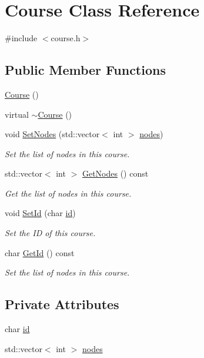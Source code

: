 \hypertarget{classCourse}{\section{\-Course \-Class \-Reference}
\label{classCourse}
}


{\ttfamily \#include $<$course.\-h$>$}

\subsection*{\-Public \-Member \-Functions}
\begin{DoxyCompactItemize}
\item 
\hyperlink{classCourse_a6b959ccf15d9ceed9e9c14a701561982}{\-Course} ()
\item 
virtual \hyperlink{classCourse_aa9038f2e129526920037dda9e76d69d0}{$\sim$\-Course} ()
\item 
void \hyperlink{classCourse_adf3085828bb525ab154269ccec3e92a0}{\-Set\-Nodes} (std\-::vector$<$ int $>$ \hyperlink{classCourse_a4632a36a3759d00c6da824eafe8a50b2}{nodes})
\begin{DoxyCompactList}\small\item\em \-Set the list of nodes in this course. \end{DoxyCompactList}\item 
std\-::vector$<$ int $>$ \hyperlink{classCourse_a8524edc4e1554b8d9ee5e5e9151d7c77}{\-Get\-Nodes} () const 
\begin{DoxyCompactList}\small\item\em \-Get the list of nodes in this course. \end{DoxyCompactList}\item 
void \hyperlink{classCourse_a6efc0783dafcc936338e7ffc365e1323}{\-Set\-Id} (char \hyperlink{classCourse_ae0d417ad4feae0725245ed6a15e8ea57}{id})
\begin{DoxyCompactList}\small\item\em \-Set the \-I\-D of this course. \end{DoxyCompactList}\item 
char \hyperlink{classCourse_a129280d0579695c0de99496b69be9308}{\-Get\-Id} () const 
\begin{DoxyCompactList}\small\item\em \-Set the list of nodes in this course. \end{DoxyCompactList}\end{DoxyCompactItemize}
\subsection*{\-Private \-Attributes}
\begin{DoxyCompactItemize}
\item 
char \hyperlink{classCourse_ae0d417ad4feae0725245ed6a15e8ea57}{id}
\item 
std\-::vector$<$ int $>$ \hyperlink{classCourse_a4632a36a3759d00c6da824eafe8a50b2}{nodes}
\end{DoxyCompactItemize}


